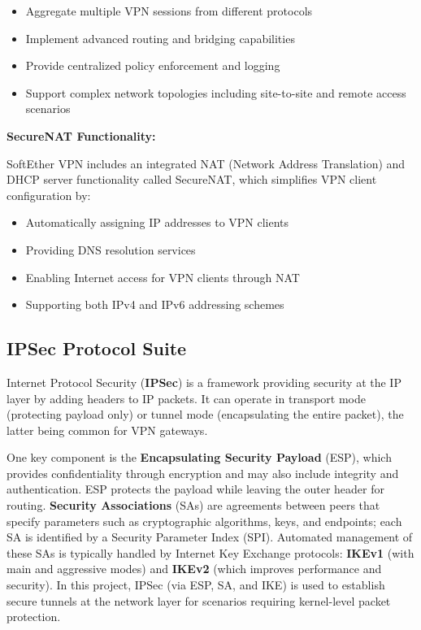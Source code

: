 \begin{itemize}
    \item Aggregate multiple VPN sessions from different protocols
    \item Implement advanced routing and bridging capabilities
    \item Provide centralized policy enforcement and logging
    \item Support complex network topologies including site-to-site and remote access scenarios
\end{itemize}

\noindent
\textbf{SecureNAT Functionality:}

\noindent
SoftEther VPN includes an integrated NAT (Network Address Translation) and DHCP server functionality called SecureNAT, which simplifies VPN client configuration by:

\begin{itemize}
    \item Automatically assigning IP addresses to VPN clients
    \item Providing DNS resolution services
    \item Enabling Internet access for VPN clients through NAT
    \item Supporting both IPv4 and IPv6 addressing schemes
\end{itemize}

\subsection{IPSec Protocol Suite}

Internet Protocol Security (\textbf{IPSec}) is a framework providing security at the IP layer by adding headers to IP packets. It can operate in transport mode (protecting payload only) or tunnel mode (encapsulating the entire packet), the latter being common for VPN gateways.

\noindent
One key component is the \textbf{Encapsulating Security Payload} (ESP), which provides confidentiality through encryption and may also include integrity and authentication. ESP protects the payload while leaving the outer header for routing. \textbf{Security Associations} (SAs) are agreements between peers that specify parameters such as cryptographic algorithms, keys, and endpoints; each SA is identified by a Security Parameter Index (SPI). Automated management of these SAs is typically handled by Internet Key Exchange protocols: \textbf{IKEv1} (with main and aggressive modes) and \textbf{IKEv2} (which improves performance and security). In this project, IPSec (via ESP, SA, and IKE) is used to establish secure tunnels at the network layer for scenarios requiring kernel-level packet protection.

